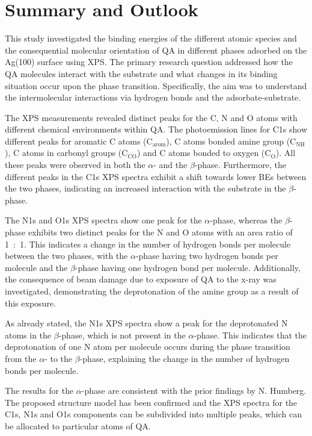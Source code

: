 \chapter{Summary and Outlook}

This study investigated the binding energies of the different atomic species and the consequential molecular orientation of \ac{QA} in different phases adsorbed on the Ag(100) surface using \ac{XPS}. The primary research question addressed how the \ac{QA} molecules interact with the substrate and what changes in its binding situation occur upon the phase transition. Specifically, the aim was to understand the intermolecular interactions via hydrogen bonds and the adsorbate-substrate.

The \ac{XPS} measurements revealed distinct peaks for the C, N and O atoms with different chemical environments within \ac{QA}. The photoemission lines for C1s show different peaks for aromatic C atoms (C$_{\text{arom}}$), C atoms bonded amine group (C$_{\text{NH}}$), C atoms in carbonyl groups (C$_{\text{CO}}$) and C atoms bonded to oxygen (C$_{\text{O}}$). All these peaks were observed in both the $\alpha$- and the $\beta$-phase. Furthermore, the different peaks in the C1s \ac{XPS} spectra exhibit a shift towards lower \acp{BE} between the two phases, indicating an increased interaction with the substrate in the $\beta$-phase.

The N1s and O1s \ac{XPS} spectra show one peak for the $\alpha$-phase, whereas the $\beta$-phase exhibits two distinct peaks for the N and O atoms with an area ratio of 1~:~1. This indicates a change in the number of hydrogen bonds per molecule between the two phases, with the $\alpha$-phase having two hydrogen bonds per molecule and the $\beta$-phase having one hydrogen bond per molecule. Additionally, the consequence of beam damage due to exposure of \ac{QA} to the x-ray was investigated, demonstrating the deprotonation of the amine group as a result of this exposure.

As already stated, the N1s \ac{XPS} spectra show a peak for the deprotonated N atoms in the $\beta$-phase, which is not present in the $\alpha$-phase. This indicates that the deprotonation of one N atom per molecule occurs during the phase transition from the $\alpha$- to the $\beta$-phase, explaining the change in the number of hydrogen bonds per molecule.

The results for the $\alpha$-phase are consistent with the prior findings by N. Humberg.\autocite{Humberg2024,Humberg2020} The proposed structure model has been confirmed and the \ac{XPS} spectra for the C1s, N1s and O1s components can be subdivided into multiple peaks, which can be allocated to particular atoms of \ac{QA}.

